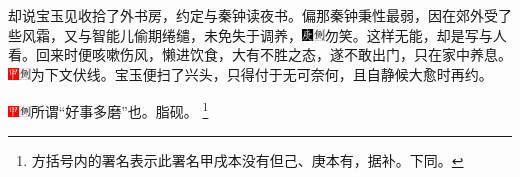 却说宝玉见收拾了外书房，约定与秦钟读夜书。偏那秦钟秉性最弱，因在郊外受了些风霜，又与智能儿偷期绻缱，未免失于调养，{\includegraphics[width=3mm]{../Images/00004}\includegraphics[width=3mm]{../Images/00011}\footnotesize \kaishu 勿笑。这样无能，却是写与人看。}回来时便咳嗽伤风，懒进饮食，大有不胜之态，遂不敢出门，只在家中养息。{\includegraphics[width=3mm]{../Images/00002}\includegraphics[width=3mm]{../Images/00011}\footnotesize \kaishu 为下文伏线。}宝玉便扫了兴头，只得付于无可奈何，且自静候大愈时再约。{{{\includegraphics[width=3mm]{../Images/00002}\includegraphics[width=3mm]{../Images/00011}\footnotesize \kaishu 所谓“好事多磨”也。脂砚。}
}\footnote{方括号内的署名表示此署名甲戌本没有但己、庚本有，据补。下同。}

}
